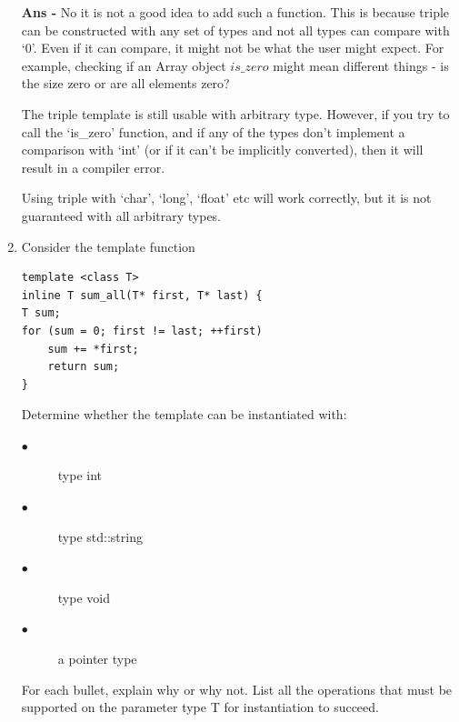 \documentclass{article}
\begin{document}
\begin{enumerate}
\textbf{Ans - }No it is not a good idea to add such a function. This is because triple can be constructed with any set of types and not all types can compare with `0'. Even if it can compare, it might not be what the user might expect. For example, checking if an Array object $is\_zero$ might mean different things - is the size zero or are all elements zero?

The triple template is still usable with arbitrary type. However, if you try to call the `is\_zero' function, and if any of the types don't implement a comparison with `int' (or if it can't be implicitly converted), then it will result in a compiler error. 

Using triple with `char', `long', `float' etc will work correctly, but it is not guaranteed with all arbitrary types.

\item Consider the template function

\begin{lstlisting}
template <class T>
inline T sum_all(T* first, T* last) {
T sum;
for (sum = 0; first != last; ++first)
    sum += *first;
    return sum;
}
\end{lstlisting}

Determine whether the template can be instantiated with:
\begin{description}
  \item[$\bullet$] type int
  \item[$\bullet$] type std::string
  \item[$\bullet$] type void
  \item[$\bullet$] a pointer type
\end{description}

For each bullet, explain why or why not. List all the operations that must be supported on the parameter
type T for instantiation to succeed.


\end{enumerate}
\end{document}
